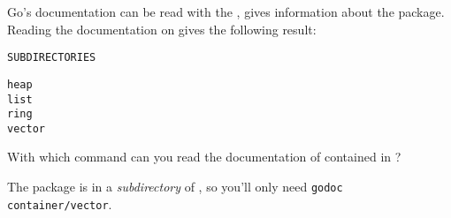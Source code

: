 \begin{Exercise}[title={Documentation},difficulty=1]
\label{ex:doc}
\Question
Go's documentation can be read with the , 
gives information about the  package. Reading the
documentation on  gives the following result:
\begin{alltt}
SUBDIRECTORIES

heap
list
ring
vector
\end{alltt}

With which  command can you read the documentation of  contained in
?

\end{Exercise}

\begin{Answer}
\Question
The package  is in a \emph{subdirectory} of
, so you'll only need \texttt{godoc
container/vector}.

\end{Answer}


